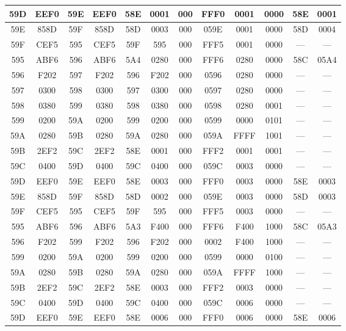 \begin{center}
\begin{tabular}{|c|c|c|c|c|c|c|c|c|c|c|c|}
		\hline
		59D & EEF0 & 59E & EEF0 & 58E & 0001 & 000 & FFF0 & 0001 & 0000 & 58E & 0001\\
		\hline
		59E & 858D & 59F & 858D & 58D & 0003 & 000 & 059E & 0001 & 0000 & 58D & 0004\\
		\hline
		59F & CEF5 & 595 & CEF5 & 59F & 595 & 000 & FFF5 & 0001 & 0000 & --- & ---\\
		\hline
		595 & ABF6 & 596 & ABF6 & 5A4 & 0280 & 000 & FFF6 & 0280 & 0000 & 58C & 05A4\\
		\hline
		596 & F202 & 597 & F202 & 596 & F202 & 000 & 0596 & 0280 & 0000 & --- & ---\\
		\hline
		597 & 0300 & 598 & 0300 & 597 & 0300 & 000 & 0597 & 0280 & 0000 & --- & ---\\
		\hline
		598 & 0380 & 599 & 0380 & 598 & 0380 & 000 & 0598 & 0280 & 0001 & --- & ---\\
		\hline
		599 & 0200 & 59A & 0200 & 599 & 0200 & 000 & 0599 & 0000 & 0101 & --- & ---\\
		\hline
		59A & 0280 & 59B & 0280 & 59A & 0280 & 000 & 059A & FFFF & 1001 & --- & ---\\
		\hline
		59B & 2EF2 & 59C & 2EF2 & 58E & 0001 & 000 & FFF2 & 0001 & 0001 & --- & ---\\
		\hline
		59C & 0400 & 59D & 0400 & 59C & 0400 & 000 & 059C & 0003 & 0000 & --- & ---\\
		\hline
		59D & EEF0 & 59E & EEF0 & 58E & 0003 & 000 & FFF0 & 0003 & 0000 & 58E & 0003\\
		\hline
		59E & 858D & 59F & 858D & 58D & 0002 & 000 & 059E & 0003 & 0000 & 58D & 0003\\
		\hline
		59F & CEF5 & 595 & CEF5 & 59F & 595 & 000 & FFF5 & 0003 & 0000 & --- & ---\\
		\hline
		595 & ABF6 & 596 & ABF6 & 5A3 & F400 & 000 & FFF6 & F400 & 1000 & 58C & 05A3\\
		\hline
		596 & F202 & 599 & F202 & 596 & F202 & 000 & 0002 & F400 & 1000 & --- & ---\\
		\hline
		599 & 0200 & 59A & 0200 & 599 & 0200 & 000 & 0599 & 0000 & 0100 & --- & ---\\
		\hline
		59A & 0280 & 59B & 0280 & 59A & 0280 & 000 & 059A & FFFF & 1000 & --- & ---\\
		\hline
		59B & 2EF2 & 59C & 2EF2 & 58E & 0003  & 000 & FFF2 & 0003 & 0000 & --- & ---\\
		\hline
		59C & 0400 & 59D & 0400 & 59C & 0400 & 000 & 059C & 0006 & 0000 & --- & ---\\
		\hline
		59D & EEF0 & 59E & EEF0 & 58E & 0006 & 000 & FFF0 & 0006 & 0000 & 58E & 0006\\

\end{tabular}
\end{center}
